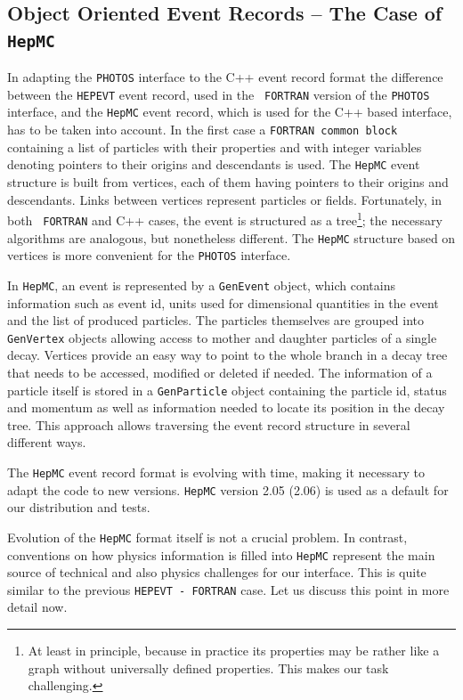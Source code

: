 \documentclass[]{Photos_interface_design}
\begin{document}
\subsection{Object Oriented Event Records  -- The Case of {\tt HepMC}}
 In adapting the {\tt PHOTOS} interface to the C++ event record format
the difference between the {\tt HEPEVT} event record, used in the {\tt
  FORTRAN} version of the {\tt PHOTOS} interface, and the {\tt HepMC} event
record, which is used for the C++ based interface, has to be taken into
account.  In the first case 
a {\tt FORTRAN common block} containing a list of particles with their properties and
with integer variables denoting pointers to their origins and
descendants is used.  The {\tt HepMC} event structure is built from vertices,
each of them having pointers to their origins and descendants. Links
between vertices represent particles or fields.  Fortunately, in both {\tt
  FORTRAN} and C++ cases, the event is structured as a
tree\footnote{At least in principle, because in practice its
properties may be rather like a graph without universally defined
properties.  This makes our task challenging.}; the necessary
algorithms are analogous, but nonetheless different. The {\tt HepMC}
structure based on vertices is more convenient for the {\tt PHOTOS}
interface. 

In {\tt HepMC}, an event is represented by a {\tt GenEvent} object,
which contains information such as event id,
units used for dimensional quantities in the event and the list of produced particles. The particles
themselves are grouped into {\tt GenVertex} objects allowing access to mother
and daughter particles of a single decay. Vertices provide an easy way
to point to the whole branch in a decay tree that needs to be accessed,
modified or deleted if needed. The information of a particle  itself is stored
in a {\tt GenParticle} object containing the particle id, status and momentum
as well as information needed to locate its position in the decay tree.
This approach allows traversing the event record structure in several different
ways.

The {\tt HepMC} event record format is  evolving with time, making it necessary
 to adapt
the code to new versions.
{\tt HepMC} version 2.05 (2.06) is used as a default for our distribution and tests. 

Evolution of the {\tt HepMC} format itself is not a crucial problem.
In contrast, conventions on how physics information is  filled into {\tt HepMC}
represent the main source of technical and also physics 
challenges for our interface. 
This is quite similar to the previous
{\tt HEPEVT - FORTRAN} case. Let us discuss this point in more detail now.
\end{document}
